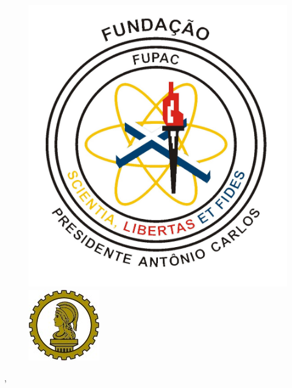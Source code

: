 \begin{capa}%
    \begin{center}
    	\begin{figure}[!htb]
            \includegraphics[scale=0.07]{imagens/unipac.jpg} 
    		\hfill
        		\begin{minipage}{10cm} \vskip -3cm
        		\ABNTEXchapterfont\large{}
                \end{minipage}
    		\includegraphics[scale=0.85]{imagens/eng.jpg}
    	\end{figure}
    \end{center}
    \center

    \vfill
    \ABNTEXchapterfont\bfseries\LARGE\imprimirtitulo
    \vfill

	\ABNTEXchapterfont\large\imprimirautor
	\vfill
%
    \large\imprimirlocal, \large\imprimirdata

    \vspace*{1cm}
 \end{capa}
